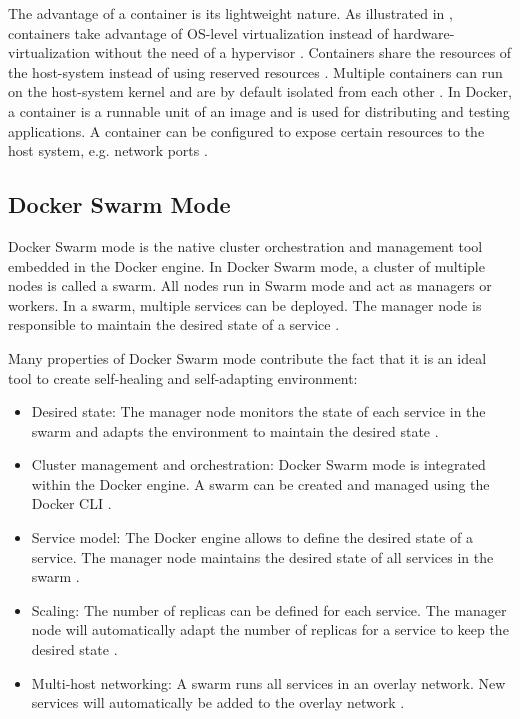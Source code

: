 The advantage of a container is its lightweight nature. As illustrated in , containers take advantage of OS-level virtualization instead of hardware-virtualization without the need of a hypervisor \cite{Docker2020Docs, Nickoloff2019Docker}. Containers share the resources of the host-system instead of using reserved resources \cite{Bullington2020Docker}. Multiple containers can run on the host-system kernel and are by default isolated from each other \cite{Docker2020Docs}.
In Docker, a container is a runnable unit of an image and is used for distributing and testing applications. A container can be configured to expose certain resources to the host system, e.g. network ports \cite{Bullington2020Docker}.


\subsection{Docker Swarm Mode}
\label{subsec:04_docker_swarm}
Docker Swarm mode is the native cluster orchestration and management tool embedded in the Docker engine.
In Docker Swarm mode, a cluster of multiple nodes is called a swarm. All nodes run in Swarm mode and act as managers or workers.
In a swarm, multiple services can be deployed. The manager node is responsible to maintain the desired state of a service \cite{Docker2020Docs}.


% 
Many properties of Docker Swarm mode contribute the fact that it is an ideal tool to create self-healing and self-adapting environment:
\begin{itemize}
\item Desired state: The manager node monitors the state of each service in the swarm and adapts the environment to maintain the desired state \cite{Docker2020Docs}.

\item Cluster management and orchestration: Docker Swarm mode is integrated within the Docker engine. A swarm can be created and managed using the Docker CLI \cite{Docker2020Docs}.

\item Service model: The Docker engine allows to define the desired state of a service. The manager node maintains the desired state of all services in the swarm \cite{Docker2020Docs}.

\item Scaling: The number of replicas can be defined for each service. The manager node will automatically adapt the number of replicas for a service to keep the desired state \cite{Docker2020Docs}.

\item Multi-host networking: A swarm runs all services in an overlay network. New services will automatically be added to the overlay network \cite{Docker2020Docs}.
\end{itemize}


